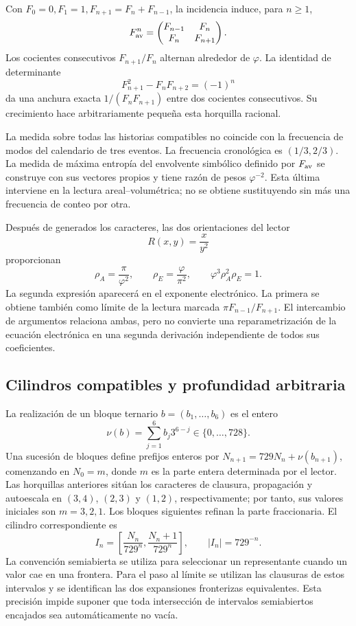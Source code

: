 Con \(F_0=0,F_1=1,F_{n+1}=F_n+F_{n-1}\), la incidencia induce, para \(n\geq1\),
\[
 F_{\rm av}^n=\begin{pmatrix}F_{n-1}&F_n\\F_n&F_{n+1}\end{pmatrix}.
\]
Los cocientes consecutivos \(F_{n+1}/F_n\) alternan alrededor de \(\varphi\). La identidad de determinante
\[
 F_{n+1}^2-F_nF_{n+2}=(-1)^n
\]
da una anchura exacta \(1/(F_nF_{n+1})\) entre dos cocientes consecutivos. Su crecimiento hace arbitrariamente pequeña esta horquilla racional.

La medida sobre todas las historias compatibles no coincide con la frecuencia de modos del calendario de tres eventos. La frecuencia cronológica es \((1/3,2/3)\). La medida de máxima entropía del envolvente simbólico definido por \(F_{\rm av}\) se construye con sus vectores propios y tiene razón de pesos \(\varphi^{-2}\). Esta última interviene en la lectura areal--volumétrica; no se obtiene sustituyendo sin más una frecuencia de conteo por otra.

Después de generados los caracteres, las dos orientaciones del lector
\[
 R(x,y)=\frac{x}{y^2}
\]
proporcionan
\begin{equation}
 \rho_A=\frac\pi{\varphi^2},\qquad
 \rho_E=\frac\varphi{\pi^2},\qquad
 \varphi^3\rho_A^2\rho_E=1.
 \label{eq:areal-electron}
\end{equation}
La segunda expresión aparecerá en el exponente electrónico. La primera se obtiene también como límite de la lectura marcada \(\pi F_{n-1}/F_{n+1}\). El intercambio de argumentos relaciona ambas, pero no convierte una reparametrización de la ecuación electrónica en una segunda derivación independiente de todos sus coeficientes.



\subsection{Cilindros compatibles y profundidad arbitraria}

La realización de un bloque ternario \(b=(b_1,\ldots,b_6)\) es el entero
\[
 \nu(b)=\sum_{j=1}^6b_j3^{6-j}\in\{0,\ldots,728\}.
\]
Una sucesión de bloques define prefijos enteros por \(N_{n+1}=729N_n+\nu(b_{n+1})\), comenzando en \(N_0=m\), donde \(m\) es la parte entera determinada por el lector. Las horquillas anteriores sitúan los caracteres de clausura, propagación y autoescala en \((3,4)\), \((2,3)\) y \((1,2)\), respectivamente; por tanto, sus valores iniciales son \(m=3,2,1\). Los bloques siguientes refinan la parte fraccionaria. El cilindro correspondiente es
\begin{equation}
 I_n=\left[\frac{N_n}{729^n},\frac{N_n+1}{729^n}\right],
 \qquad |I_n|=729^{-n}.
 \label{eq:cilindro}
\end{equation}
La convención semiabierta se utiliza para seleccionar un representante cuando un valor cae en una frontera. Para el paso al límite se utilizan las clausuras de estos intervalos y se identifican las dos expansiones fronterizas equivalentes. Esta precisión impide suponer que toda intersección de intervalos semiabiertos encajados sea automáticamente no vacía.

